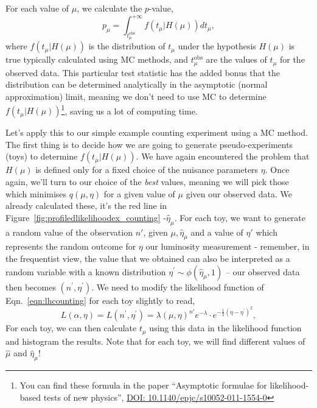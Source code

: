 For each value of $\mu$, we calculate the $p$-value, 
\begin{equation}
    p_{\mu} = \int_{t^{\mathrm{obs}}_{\mu}}^{+\infty} f(t_{\mu}|H(\mu))dt_{\mu},
\end{equation}
where $f(t_{\mu}|H(\mu))$ is the distribution of $t_{\mu}$ under the hypothesis $H(\mu)$ is true typically calculated using MC methods, and $t^{\mathrm{obs}}_{\mu}$ are the values of $t_{\mu}$ for the observed data. This particular test statistic has the added bonus that the distribution can be determined analytically in the asymptotic (normal approximation) limit, meaning we don't need to use MC to determine $f(t_{\mu}|H(\mu))$\footnote{You can find these formula in the paper ``Asymptotic formulae for likelihood-based tests of new physics'', \href{https://arxiv.org/abs/1007.1727}{DOI: 10.1140/epjc/s10052-011-1554-0}}, saving us a lot of computing time.

Let's apply this to our simple example counting experiment using a MC method. The first thing is to decide how we are going to generate pseudo-experiments (toys) to determine $f(t_{\mu}|H(\mu))$. We have again encountered the problem that $H(\mu)$ is defined only for a fixed choice of the nuisance parameters $\eta$. Once again, we'll turn to our choice of the \emph{best} values, meaning we will pick those which minimises $q(\mu,\eta)$ for a given value of $\mu$ given our observed data. We already calculated these, it's the red line in Figure~\ref{fig:profiledlikelihoodex_counting} -$\hat{\eta}_{\mu}$. For each toy, we want to generate a random value of the observation $n'$, given $\mu,\hat{\eta}_{\mu}$ and a value of $\eta'$ which represents the random outcome for $\eta$ our luminosity measurement - remember, in the frequentist view, the value that we obtained can also be interpreted as a random variable with a known distribution $\eta{^{\prime}}\sim\phi(\hat{\eta}_{\mu},1)$ -- our observed data then becomes $(n^{\prime},\eta^{\prime})$. We need to modify the likelihood function of Eqn.~\ref{eqn:lhcounting} for each toy slightly to read, 
\begin{equation}
    L(\alpha,\eta) = L(n^{\prime},\eta^{\prime}) = \lambda(\mu,\eta)^{n\prime}e^{-\lambda}\cdot e^{-\frac{1}{2}(\eta-\eta^{\prime})^{2}},
\end{equation}
For each toy, we can then calculate $t_{\mu}$ using this data in the likelihood function and histogram the results. Note that for each toy, we will find different values of $\hat{\mu}$ and $\hat{\eta}_{\mu}$! 

